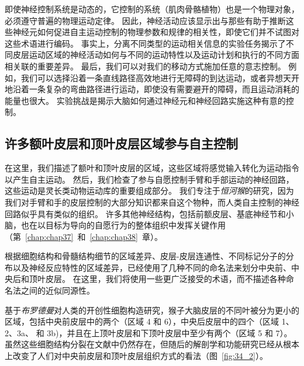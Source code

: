 即使神经控制系统是动态的，它控制的系统（肌肉骨骼植物）也是一个物理对象，必须遵守普遍的物理运动定律。
因此，神经活动应该显示出与那些有助于推断这些神经元如何促进自主运动控制的物理参数和规律的相关性，即使它们并不试图对这些术语进行编码。
事实上，分离不同类型的运动相关信息的实验任务揭示了不同皮层运动区域的神经活动如何与不同的运动特性以及运动计划和执行的不同方面相关联的重要差异。
最后，我们可以对我们的移动方式施加任意的意志控制。
例如，我们可以选择沿着一条直线路径高效地进行无障碍的到达运动，或者异想天开地沿着一条复杂的弯曲路径进行运动，即使没有需要避开的障碍，而且运动消耗的能量也很大。
实验挑战是揭示大脑如何通过神经元和神经回路实施这种有意的控制。



\subsection{许多额叶皮层和顶叶皮层区域参与自主控制}

在这里，我们描述了额叶和顶叶皮层的区域，这些区域将感觉输入转化为运动指令以产生自主运动。
然后，我们检查了参与自愿控制手臂和手部运动的神经回路，这些运动是灵长类动物运动库的重要组成部分。
我们专注于\textit{恒河猴}的研究，因为我们对手臂和手的皮层控制的大部分知识都来自这个物种，而人类自主控制的神经回路似乎具有类似的组织。
许多其他神经结构，包括前额皮层、基底神经节和小脑，也在以目标为导向的自愿行为的整体组织中发挥关键作用（第~\ref{chap:chap37}~和~\ref{chap:chap38}~章）。


根据细胞结构和骨髓结构细节的区域差异、皮层-皮层连通性、不同标记分子的分布以及神经反应特性的区域差异，已经使用了几种不同的命名法来划分中央前、中央后和顶叶皮层。
在这里，我们将使用一些更广泛接受的术语，而不描述各种命名法之间的近似同源性。


基于\textit{布罗德曼}对人类的开创性细胞构造研究，猴子大脑皮层的不同叶被分为更小的区域，包括中央前皮层中的两个（区域 4 和 6），中央后皮层中的四个（区域 1、2、3a、 和 3b)，并且在上顶叶皮层和下顶叶皮层中至少有两个（区域 5 和 7）。
虽然这些细胞结构分裂在文献中仍然存在，但随后的解剖学和功能研究已经从根本上改变了人们对中央前皮层和顶叶皮层组织方式的看法（图~\ref{fig:34_2}）。


